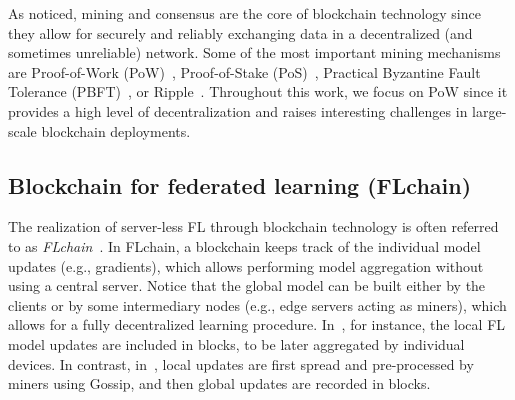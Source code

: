 \documentclass[lettersize,journal]{IEEEtran}
\begin{document}
As noticed, mining and consensus are the core of blockchain technology since they allow for securely and reliably exchanging data in a decentralized (and sometimes unreliable) network. Some of the most important mining mechanisms are Proof-of-Work (PoW)~\cite{nakamoto2008bitcoin}, Proof-of-Stake (PoS)~\cite{saleh2021blockchain}, Practical Byzantine Fault Tolerance (PBFT)~\cite{castro1999practical}, or Ripple~\cite{schwartz2014ripple}. Throughout this work, we focus on PoW since it provides a high level of decentralization and raises interesting challenges in large-scale blockchain deployments.

\subsection{Blockchain for federated learning (FLchain)}
\label{section:flchain}

The realization of server-less FL through blockchain technology is often referred to as \textit{FLchain}~\cite{majeed2019flchain,nguyen2021federated}. In FLchain, a blockchain keeps track of the individual model updates 
(e.g., gradients), which allows performing model aggregation without using a central server. Notice that the global model can be built either by the clients or by some intermediary nodes (e.g., edge servers acting as miners), which allows for a fully decentralized learning procedure. In~\cite{kim2019blockchained}, for instance, the local FL model updates are included in blocks, to be later aggregated by individual devices. In contrast, in~\cite{ma2020federated}, local updates are first spread and pre-processed by miners using Gossip, and then global updates are recorded in blocks.
\end{document}
